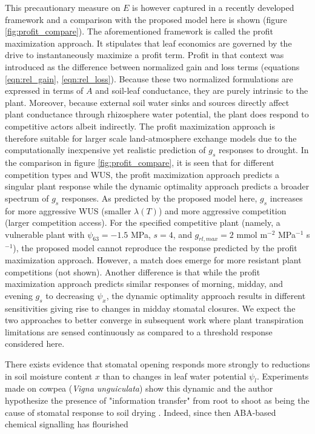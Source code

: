 \documentclass[utf8]{frontiersSCNS} %
\begin{document}
This precautionary measure on $E$ is however captured in a recently developed framework \citep{sperry_pragmatic_2016, sperry_predicting_2017} and a comparison with the proposed model here is shown (figure \ref{fig:profit_compare}). The aforementioned framework is called the profit maximization approach. It stipulates that leaf economics are governed by the drive to instantaneously maximize a profit term. Profit in that context was introduced as the difference between normalized gain and loss terms (equations \ref{eqn:rel_gain}, \ref{eqn:rel_loss}). Because these two normalized formulations are expressed in terms of $A$ and soil-leaf conductance, they are purely intrinsic to the plant. Moreover, because external soil water sinks and sources directly affect plant conductance through rhizosphere water potential, the plant does respond to competitive actors albeit indirectly. The profit maximization approach is therefore suitable for larger scale land-atmosphere exchange models due to the computationally inexpensive yet realistic prediction of $g_s$ responses to drought. In the comparison in figure \ref{fig:profit_compare}, it is seen that for different competition types and WUS, the profit maximization approach predicts a singular plant response while the dynamic optimality approach predicts a broader spectrum of $g_s$ responses. As predicted by the proposed model here, $g_s$ increases for more aggressive WUS (smaller $\lambda(T)$) and more aggressive competition (larger competition access). For the specified competitive plant (namely, a vulnerable plant with $\psi_{63} = -1.5$ MPa, $s=4$, and $g_{rl,max} = 2$ mmol m$^{-2}$ MPa$^{-1}$ s$^{-1}$), the proposed model cannot reproduce the response predicted by the profit maximization approach. However, a match does emerge for more resistant plant competitions (not shown). Another difference is that while the profit maximization approach predicts similar responses of morning, midday, and evening $g_s$ to decreasing $\psi_x$, the dynamic optimality approach results in different sensitivities giving rise to changes in midday stomatal closures. We expect the two approaches to better converge in subsequent work where plant transpiration limitations are sensed continuously as compared to a threshold response considered here.

There exists evidence that stomatal opening responds more strongly to reductions in soil moisture content $x$ than to changes in leaf water potential $\psi_l$. Experiments made on cowpea (\textit{Vigna unguiculata}) show this dynamic and the author hypothesize the presence of "information transfer" from root to shoot as being the cause of stomatal response to soil drying \citep{bates1981stomatal}. Indeed, since then ABA-based chemical signalling has flourished
\end{document}
